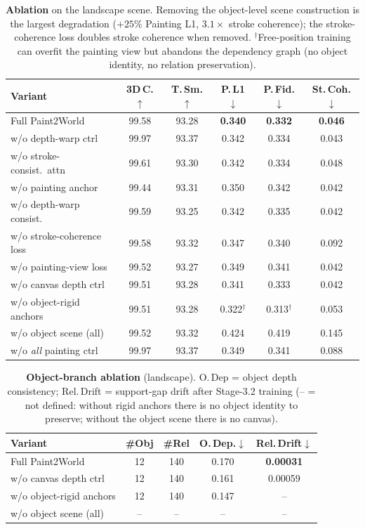 \documentclass[10pt,twocolumn,letterpaper]{article}
\begin{document}
\begin{table}[t]
\centering
\scriptsize
\setlength{\tabcolsep}{3pt}
\begin{tabular*}{\linewidth}{@{\extracolsep{\fill}}lccccc}
\toprule
Variant & 3D\,C.$\uparrow$ & T.\,Sm.$\uparrow$ & P.\,L1$\downarrow$ & P.\,Fid.$\downarrow$ & St.\,Coh.$\downarrow$ \\
\midrule
Full Paint2World & 99.58 & 93.28 & \textbf{0.340} & \textbf{0.332} & \textbf{0.046} \\
\midrule
w/o depth-warp ctrl & 99.97 & 93.37 & 0.342 & 0.334 & 0.043 \\
w/o stroke-consist.\ attn & 99.61 & 93.30 & 0.342 & 0.334 & 0.048 \\
w/o painting anchor & 99.44 & 93.31 & 0.350 & 0.342 & 0.042 \\
w/o depth-warp consist. & 99.59 & 93.25 & 0.342 & 0.335 & 0.042 \\
w/o stroke-coherence loss & 99.58 & 93.32 & 0.347 & 0.340 & 0.092 \\
w/o painting-view loss & 99.52 & 93.27 & 0.349 & 0.341 & 0.042 \\
w/o canvas depth ctrl & 99.51 & 93.28 & 0.341 & 0.333 & 0.042 \\
w/o object-rigid anchors & 99.51 & 93.28 & 0.322$^\dagger$ & 0.313$^\dagger$ & 0.053 \\
\midrule
w/o object scene (all) & 99.52 & 93.32 & 0.424 & 0.419 & 0.145 \\
w/o \emph{all} painting ctrl & 99.97 & 93.37 & 0.349 & 0.341 & 0.088 \\
\bottomrule
\end{tabular*}
\caption{\textbf{Ablation} on the landscape scene. Removing the object-level
scene construction is the largest degradation ($+25\%$ Painting L1,
$3.1\times$ stroke coherence); the stroke-coherence loss doubles stroke
coherence when removed. $^\dagger$Free-position training can overfit the
painting view but abandons the dependency graph (no object identity, no
relation preservation).}
\label{tab:ablation}
\end{table}

\begin{table}[t]
\centering
\scriptsize
\setlength{\tabcolsep}{3pt}
\begin{tabular*}{\linewidth}{@{\extracolsep{\fill}}lcccc}
\toprule
Variant & \#Obj & \#Rel & O.\,Dep.$\downarrow$ & Rel.\,Drift$\downarrow$ \\
\midrule
Full Paint2World & 12 & 140 & 0.170 & \textbf{0.00031} \\
w/o canvas depth ctrl & 12 & 140 & 0.161 & 0.00059 \\
w/o object-rigid anchors & 12 & 140 & 0.147 & -- \\
w/o object scene (all) & -- & -- & -- & -- \\
\bottomrule
\end{tabular*}
\caption{\textbf{Object-branch ablation} (landscape). O.\,Dep = object
depth consistency; Rel.\,Drift = support-gap drift after Stage-3.2 training
(-- = not defined: without rigid anchors there is no object identity to
preserve; without the object scene there is no canvas).}
\label{tab:ablation-object}
\end{table}
\end{document}

